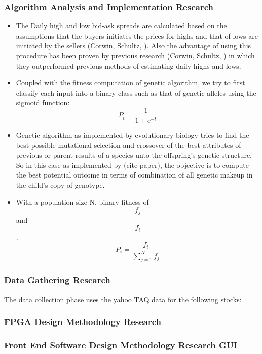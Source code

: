 \documentclass{sig-alternate}
\begin{document}
	     \subsubsection{Algorithm Analysis and Implementation Research}
	     \begin{itemize}
		     \item The Daily high and low bid-ask spreads are calculated based on the assumptions that the buyers initiates the prices for highs and that of lows are initiated by the sellers (Corwin, Schultz, ). Also the advantage of using this procedure has been proven by previous research (Corwin, Schultz, ) in which they outperformed previous methods of estimating daily highs and lows. 
		     \item Coupled with the fitness computation of genetic algorithm, we try to first classify each input into a binary class such as that of genetic alleles using the sigmoid function: 
		     \begin{equation} 
		     P_t = \frac{1}{1 + e^{-t} }
		     \end{equation}
			 \item Genetic algorithm as implemented by evolutionary biology tries to find the best possible mutational selection and crossover of the best attributes of previous or parent results of a species unto the offspring's genetic structure. So in this case as implemented by (cite paper), the objective is to compute the best potential outcome in terms of combination of all genetic makeup in the child's copy of genotype. 
		 
			 \item With a population size N, binary  fitness of \[ f_{j} \] and \[ f_{i} \] . 
			\begin{equation}
			P_i = \frac{f_i}{\sum_{j=1}^{N} f_j}
			\end{equation} 
				  
	     \end{itemize}
	     \subsubsection{Data Gathering Research}
	     The data collection phase uses the yahoo TAQ data for the following stocks: 
	     \subsubsection{FPGA Design Methodology Research} 
	     \subsubsection{Front End Software Design Methodology Research GUI} 
\end{document}
